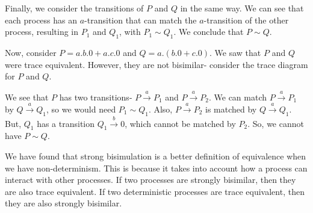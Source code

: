 \documentclass[a4paper, openany]{memoir}
\theoremstyle{definition}
\begin{document}
    Finally, we consider the transitions of $P$ and $Q$ in the same way. We can see that each process has an $a$-transition that can match the $a$-transition of the other process, resulting in $P_1$ and $Q_1$, with $P_1 \sim Q_1$. We conclude that $P \sim Q$.

    Now, consider $P = a.b.0 + a.c.0$ and $Q = a.(b.0 + c.0)$. We saw that $P$ and $Q$ were trace equivalent. However, they are not bisimilar- consider the trace diagram for $P$ and $Q$.
    \begin{figure}[H]
        \centering
    \end{figure}
    \noindent We see that $P$ has two transitions- $P \xrightarrow{a} P_1$ and $P \xrightarrow{a} P_2$. We can match $P \xrightarrow{a} P_1$ by $Q \xrightarrow{a} Q_1$, so we would need $P_1 \sim Q_1$. Also, $P \xrightarrow{a} P_2$ is matched by $Q \xrightarrow{a} Q_1$. But, $Q_1$ has a transition $Q_1 \xrightarrow{b} 0$, which cannot be matched by $P_2$. So, we cannot have $P \sim Q$.

    We have found that strong bisimulation is a better definition of equivalence when we have non-determinism. This is because it takes into account how a process can interact with other processes. If two processes are strongly bisimilar, then they are also trace equivalent. If two deterministic processes are trace equivalent, then they are also strongly bisimilar.
\end{document}
